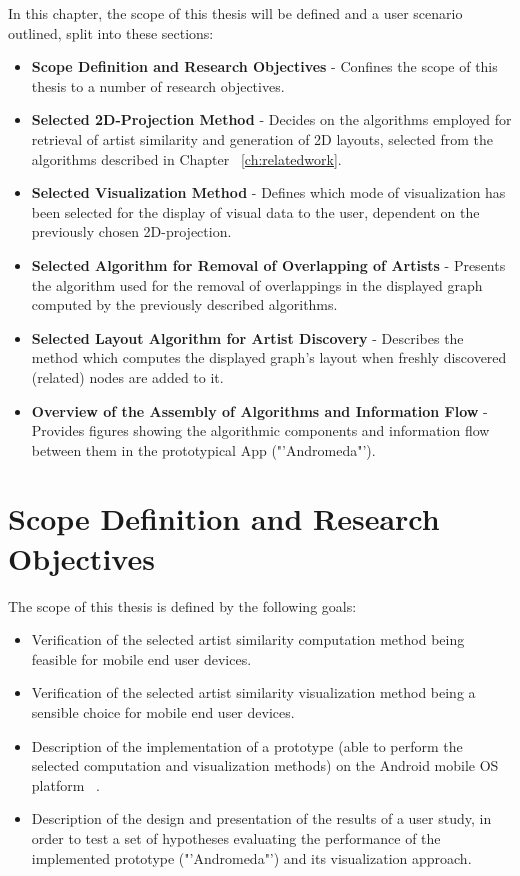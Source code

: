 In this chapter, the scope of this thesis will be defined and a user scenario outlined, split into these sections:

\begin{itemize}
	\item \textbf {Scope Definition and Research Objectives} - Confines the scope of this thesis to a number of research objectives.
	\item \textbf {Selected 2D-Projection Method} - Decides on the algorithms employed for retrieval of artist similarity and generation of 2D layouts, selected from the algorithms described in Chapter ~\ref{ch:relatedwork}.
	\item \textbf {Selected Visualization Method} - Defines which mode of visualization has been selected for the display of visual data to the user, dependent on the previously chosen 2D-projection.
	\item \textbf {Selected Algorithm for Removal of Overlapping of Artists} - Presents the algorithm used for the removal of overlappings in the displayed graph computed by the previously described algorithms.
	\item \textbf {Selected Layout Algorithm for Artist Discovery} - Describes the method which computes the displayed graph's layout when freshly discovered (related) nodes are added to it.
	\item \textbf {Overview of the Assembly of Algorithms and Information Flow} - Provides figures showing the algorithmic components and information flow between them in the prototypical App ("'Andromeda"').
\end{itemize}

\section{Scope Definition and Research Objectives}

The scope of this thesis is defined by the following goals: 

\begin{itemize}
	\item Verification of the selected artist similarity computation method being feasible for mobile end user devices.
	\item Verification of the selected artist similarity visualization method being a sensible choice for mobile end user devices.
	\item Description of the implementation of a prototype (able to perform the selected computation and visualization methods) on the Android mobile OS platform ~\cite{url:android}.
	\item Description of the design and presentation of the results of a user study, in order to test a set of hypotheses evaluating the performance of the implemented prototype ("'Andromeda"') and its visualization approach.
\end{itemize}

